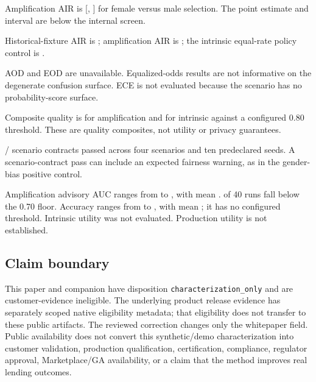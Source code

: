 \begin{KeyBox}
\begin{KeyValueList}
  \item[Gender disparity] Amplification AIR is \GenderAIRAmplification{}
    [\GenderAIRAmplificationLCI{}, \GenderAIRAmplificationUCI{}] for female versus male selection.
    The point estimate and interval are below the internal \AIRThreshold{} screen.
  \item[Branch separation] Historical-fixture AIR is \GenderAIRHistorical{}; amplification AIR is
    \GenderAIRAmplification{}; the intrinsic equal-rate policy control is \GenderAIRIntrinsic{}.
  \item[Availability] AOD and EOD are unavailable. Equalized-odds results are not informative on the
    degenerate confusion surface. ECE is not evaluated because the scenario has no probability-score
    surface.
  \item[Quality] Composite quality is \AmpQuality{} for amplification and \IntQuality{} for
    intrinsic against a configured 0.80 threshold. These are quality composites, not utility or
    privacy guarantees.
  \item[Robustness] \RobustnessPasses{}/\RobustnessRuns{} scenario contracts passed across four
    scenarios and ten predeclared seeds. A scenario-contract pass can include an expected fairness
    warning, as in the gender-bias positive control.
  \item[Utility] Amplification advisory AUC ranges from \UtilityMinAUC{} to \UtilityMaxAUC{}, with
    mean \UtilityMeanAUC{}. \UtilityBelowFloor{} of 40 runs fall below the 0.70 floor. Accuracy
    ranges from \UtilityMinAccuracy{} to \UtilityMaxAccuracy{}, with mean \UtilityMeanAccuracy{};
    it has no configured threshold. Intrinsic utility was not evaluated. Production utility is not
    established.
\end{KeyValueList}
\end{KeyBox}

\subsection{Claim boundary}

This paper and companion have disposition \texttt{characterization\_only} and are
customer-evidence ineligible. The underlying product release evidence has separately scoped native
eligibility metadata; that eligibility does not transfer to these public artifacts. The reviewed
correction changes only the whitepaper field. Public availability does not convert this
synthetic/demo characterization into customer validation, production qualification, certification,
compliance, regulator approval, Marketplace/GA availability, or a claim that the method improves
real lending outcomes.
